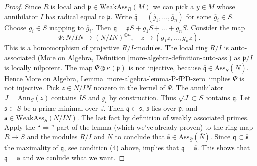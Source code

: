 \documentclass[10pt,a4paper]{amsart}
\theoremstyle{plain}
\theoremstyle{definition}
\theoremstyle{remark}
\numberwithin{equation}{subsection}
\begin{document}
\begin{proof}
\medskip\noindent
Since $R$ is local and $\mathfrak p \in \text{WeakAss}_R(M)$
we can pick a $y \in M$ whose annihilator $I$ has radical
equal to $\mathfrak p$.
Write $\overline{\mathfrak q} = (\overline{g}_1, \ldots, \overline{g}_n)$
for some $\overline{g}_i \in \overline{S}$. Choose $g_i \in S$
mapping to $\overline{g}_i$.
Then $\mathfrak q = \mathfrak pS + g_1S + \ldots + g_nS$.
Consider the map
$$
\Psi : N/IN \longrightarrow (N/IN)^{\oplus n}, \quad
z \longmapsto (g_1z, \ldots, g_nz).
$$
This is a homomorphism of projective $R/I$-modules.
The local ring $R/I$ is auto-associated
(More on Algebra, Definition \ref{more-algebra-definition-auto-ass})
as $\mathfrak p/I$ is locally nilpotent.
The map $\Psi \otimes \kappa(\mathfrak p)$ is not injective, because
$\overline{\mathfrak q} \in \text{Ass}_{\overline{S}}(\overline{N})$.
Hence More on Algebra, Lemma \ref{more-algebra-lemma-P-fPD-zero}
implies $\Psi$ is not injective. Pick $z \in N/IN$
nonzero in the kernel of $\Psi$. The annihilator $J = \text{Ann}_S(z)$
contains $IS$ and $g_i$ by construction. Thus
$\sqrt{J} \subset S$ contains $\mathfrak q$.
Let $\mathfrak s \subset S$ be a prime minimal over $J$.
Then $\mathfrak q \subset \mathfrak s$,
$\mathfrak s$ lies over $\mathfrak p$, and
$\mathfrak s \in \text{WeakAss}_S(N/IN)$.
The last fact by definition of weakly associated primes.
Apply the ``$\Rightarrow$'' part of the lemma (which we've already proven)
to the ring map $R \to S$ and the modules $R/I$ and $N$
to conclude that
$\overline{\mathfrak s} \in \text{Ass}_{\overline{S}}(\overline{N})$.
Since $\overline{\mathfrak q} \subset \overline{\mathfrak s}$
the maximality of $\overline{\mathfrak q}$, see condition (4) above,
implies that $\overline{\mathfrak q} = \overline{\mathfrak s}$.
This shows that $\mathfrak q = \mathfrak s$ and we conlude
what we want.
\end{proof}
\end{document}
